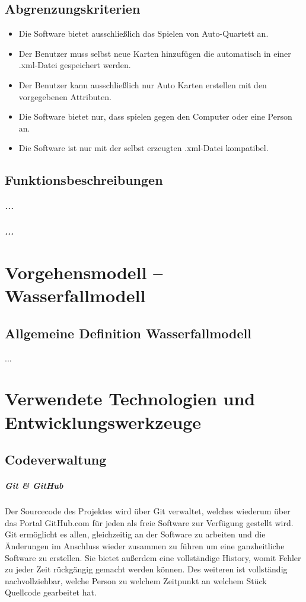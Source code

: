 \documentclass[11pt]{scrreprt}
\begin{document}
\section{Abgrenzungskriterien}
\begin{itemize}
\item Die Software bietet ausschließlich das Spielen von Auto-Quartett an.
\item Der Benutzer muss selbst neue Karten hinzufügen die automatisch in einer .xml-Datei gespeichert werden.
\item Der Benutzer kann ausschließlich nur Auto Karten erstellen  mit den vorgegebenen Attributen. 
\item Die Software bietet nur, dass spielen gegen den Computer oder eine Person an.  
\item Die Software ist nur mit der selbst erzeugten .xml-Datei kompatibel.
\end{itemize}

\section{Funktionsbeschreibungen}
\paragraph{...}


\paragraph{...}


\chapter{Vorgehensmodell – Wasserfallmodell}
\section{Allgemeine Definition Wasserfallmodell}

...


\newpage

\chapter{Verwendete Technologien und Entwicklungswerkzeuge}
\section{Codeverwaltung}
\paragraph{Git \& GitHub}
Der Sourcecode des Projektes wird über Git verwaltet, welches wiederum über das Portal GitHub.com für jeden als freie Software zur Verf\"ugung gestellt wird.
Git ermöglicht es allen, gleichzeitig an der Software zu arbeiten und die \"Anderungen im Anschluss wieder zusammen zu f\"uhren um eine ganzheitliche Software zu erstellen. Sie bietet außerdem eine vollst\"andige History, womit Fehler zu jeder Zeit r\"uckg\"angig gemacht werden k\"onnen.
Des weiteren ist vollst\"andig nachvollziehbar, welche Person zu welchem Zeitpunkt an welchem St\"uck Quellcode gearbeitet hat.
\end{document}
